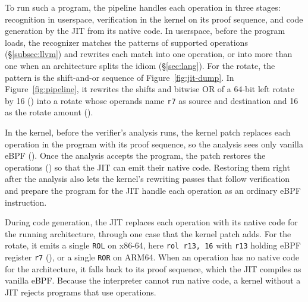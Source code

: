 To run such a program, the pipeline handles each operation in three stages: recognition in userspace, verification in the kernel on its proof sequence, and code generation by the JIT from its native code.
In userspace, before the program loads, the recognizer matches the patterns of supported operations (\S\ref{subsec:llvm}) and rewrites each match into one operation, or into more than one when an architecture splits the idiom (\S\ref{sec:lang}).
For the rotate, the pattern is the shift-and-or sequence of Figure~\ref{fig:jit-dump}.
In Figure~\ref{fig:pipeline}, it rewrites the shifts and bitwise OR of a 64-bit left rotate by 16 () into a \lang rotate whose operands name \texttt{r7} as source and destination and 16 as the rotate amount ().

In the kernel, before the verifier's analysis runs, the kernel patch replaces each operation in the program with its proof sequence, so the analysis sees only vanilla eBPF ().
Once the analysis accepts the program, the patch restores the operations () so that the JIT can emit their native code.
Restoring them right after the analysis also lets the kernel's rewriting passes that follow verification and prepare the program for the JIT handle each operation as an ordinary eBPF instruction.

During code generation, the JIT replaces each operation with its native code for the running architecture, through one case that the kernel patch adds.
For the \lang rotate, it emits a single \texttt{ROL} on x86-64, here \texttt{rol r13, 16} with \texttt{r13} holding eBPF register \texttt{r7} (), or a single \texttt{ROR} on ARM64.
When an operation has no native code for the architecture, it falls back to its proof sequence, which the JIT compiles as vanilla eBPF.
Because the interpreter cannot run native code, a kernel without a JIT rejects programs that use operations.

